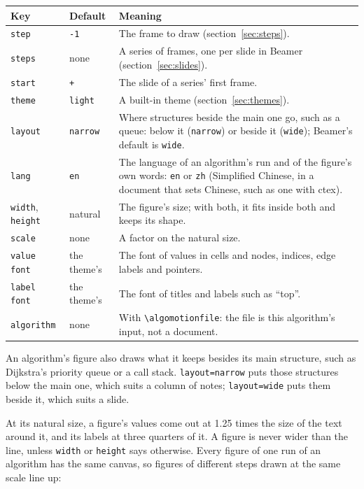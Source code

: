 \documentclass[11pt]{article}
\newcommand\pkg[1]{\textsf{#1}}
\newcommand\cs[1]{\texttt{\textbackslash#1}}
\newcommand\key[1]{\texttt{#1}}
\begin{document}
\begin{center}
  \small
  \begin{tabularx}{\linewidth}{@{}llX@{}}
    \toprule
    Key & Default & Meaning \\
    \midrule
    \key{step} & \texttt{-1} & The frame to draw (section~\ref{sec:steps}). \\
    \key{steps} & none & A series of frames, one per slide in Beamer
      (section~\ref{sec:slides}). \\
    \key{start} & \texttt{+} & The slide of a series' first frame. \\
    \key{theme} & \texttt{light} & A built-in theme
      (section~\ref{sec:themes}). \\
    \key{layout} & \texttt{narrow} & Where structures beside the main one go,
      such as a queue: below it (\texttt{narrow}) or beside it
      (\texttt{wide}); Beamer's default is \texttt{wide}. \\
    \key{lang} & \texttt{en} & The language of an algorithm's run and of the
      figure's own words: \texttt{en} or \texttt{zh} (Simplified Chinese,
      in a document that sets Chinese, such as one with \pkg{ctex}). \\
    \key{width}, \key{height} & natural & The figure's size; with both, it
      fits inside both and keeps its shape. \\
    \key{scale} & none & A factor on the natural size. \\
    \key{value font} & the theme's & The font of values in cells and nodes,
      indices, edge labels and pointers. \\
    \key{label font} & the theme's & The font of titles and labels such as
      ``top''. \\
    \key{algorithm} & none & With \cs{algomotionfile}: the file is this
      algorithm's input, not a document. \\
    \bottomrule
  \end{tabularx}
\end{center}

An algorithm's figure also draws what it keeps besides its main structure,
such as Dijkstra's priority queue or a call stack. \texttt{layout=narrow} puts
those structures below the main one, which suits a column of notes;
\texttt{layout=wide} puts them beside it, which suits a slide.

At its natural size, a figure's values come out at 1.25 times the size of the
text around it, and its labels at three quarters of it. A figure is never
wider than the line, unless \key{width} or \key{height} says otherwise. Every
figure of one run of an algorithm has the same canvas, so figures of
different steps drawn at the same scale line up:
\end{document}
